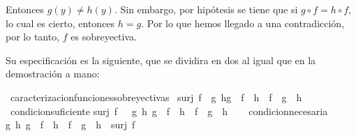 \begin{isabellebody}
\begin{isamarkuptext}
\begin {demostracion}
Entonces $g(y) \neq h(y).$ Sin embargo,
 por hipótesis se tiene  que si $g \circ f = h \circ f$, lo cual es
 cierto, entonces $h = g.$ Por lo que hemos llegado a una
 contradicción, por lo tanto, $f$ es sobreyectiva.
\end {demostracion}%
\end{isamarkuptext}\isamarkuptrue%
%
\isadelimdocument
%
\endisadelimdocument
%
\isatagdocument
%
\isamarkuptrue%
%
\endisatagdocument
{\isafolddocument}%
%
\isadelimdocument
%
\endisadelimdocument
%
\begin{isamarkuptext}%
Su especificación es la siguiente, que se dividira en dos al igual que 
en la demostración a mano:%
\end{isamarkuptext}\isamarkuptrue%
\isamarkupfalse%
\ caracterizacion{\isacharunderscore}funciones{\isacharunderscore}sobreyectivas{\isacharcolon}\isanewline
\ {\isachardoublequoteopen}surj\ f\ {\isasymlongleftrightarrow}\ {\isacharparenleft}{\isasymforall}g\ h{\isachardot}{\isacharparenleft}g\ {\isasymcirc}\ f\ {\isacharequal}\ h\ {\isasymcirc}\ f{\isacharparenright}\ {\isasymlongrightarrow}\ {\isacharparenleft}g\ {\isacharequal}\ h{\isacharparenright}{\isacharparenright}{\isachardoublequoteclose}\isanewline
%
\isadelimproof
\ \ %
\endisadelimproof
%
\isatagproof
{}\isamarkupfalse%
%
\endisatagproof
{\isafoldproof}%
%
\isadelimproof
\isanewline
%
\endisadelimproof
\isanewline
{}\isamarkupfalse%
\ condicion{\isacharunderscore}suficiente{\isacharcolon}\isanewline
{\isachardoublequoteopen}surj\ f\ {\isasymLongrightarrow}\ \ {\isacharparenleft}{\isasymforall}g\ h{\isachardot}\ {\isacharparenleft}g\ {\isasymcirc}\ f\ {\isacharequal}\ h\ {\isasymcirc}\ f{\isacharparenright}\ {\isasymlongrightarrow}\ {\isacharparenleft}g\ {\isacharequal}\ h{\isacharparenright}{\isacharparenright}{\isachardoublequoteclose}\isanewline
%
\isadelimproof
\ \ %
\endisadelimproof
%
\isatagproof
{}\isamarkupfalse%
%
\endisatagproof
{\isafoldproof}%
%
\isadelimproof
\isanewline
%
\endisadelimproof
\isanewline
{}\isamarkupfalse%
\ condicion{\isacharunderscore}necesaria{\isacharcolon}\isanewline
{\isachardoublequoteopen}{\isasymforall}g\ h{\isachardot}\ {\isacharparenleft}g\ {\isasymcirc}\ f\ {\isacharequal}\ h\ {\isasymcirc}\ f\ {\isasymlongrightarrow}\ g\ {\isacharequal}\ h{\isacharparenright}\ {\isasymlongrightarrow}\ surj\ f{\isachardoublequoteclose}\isanewline
%
\isadelimproof
\ \ %
\endisadelimproof
%
\isatagproof
{}\isamarkupfalse%

\end{isabellebody}
